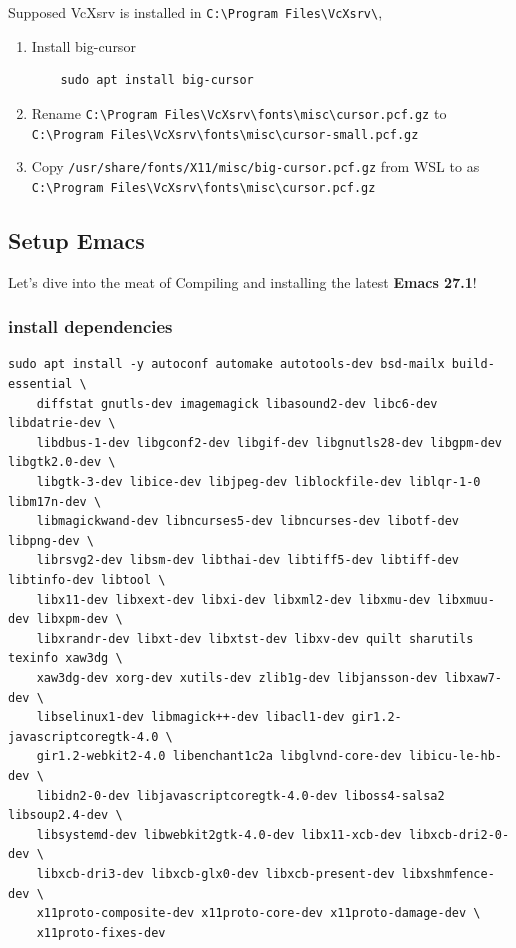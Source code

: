 \documentclass[10pt]{article}
\begin{document}
Supposed VcXsrv is installed in \texttt{C:\textbackslash{}Program Files\textbackslash{}VcXsrv\textbackslash{}},

\begin{enumerate}
\item Install big-cursor
\begin{verbatim}
    sudo apt install big-cursor
\end{verbatim}
\item Rename
\texttt{C:\textbackslash{}Program Files\textbackslash{}VcXsrv\textbackslash{}fonts\textbackslash{}misc\textbackslash{}cursor.pcf.gz} to \texttt{C:\textbackslash{}Program Files\textbackslash{}VcXsrv\textbackslash{}fonts\textbackslash{}misc\textbackslash{}cursor-small.pcf.gz}
\item Copy \texttt{/usr/share/fonts/X11/misc/big-cursor.pcf.gz} from WSL to as \texttt{C:\textbackslash{}Program Files\textbackslash{}VcXsrv\textbackslash{}fonts\textbackslash{}misc\textbackslash{}cursor.pcf.gz}
\end{enumerate}

\subsection{Setup Emacs}
\label{sec:org5d2392f}
Let's dive into the meat of Compiling and installing the latest \textbf{Emacs 27.1}!
\subsubsection{install dependencies}
\label{sec:org0723e69}
\begin{verbatim}
sudo apt install -y autoconf automake autotools-dev bsd-mailx build-essential \
    diffstat gnutls-dev imagemagick libasound2-dev libc6-dev libdatrie-dev \
    libdbus-1-dev libgconf2-dev libgif-dev libgnutls28-dev libgpm-dev libgtk2.0-dev \
    libgtk-3-dev libice-dev libjpeg-dev liblockfile-dev liblqr-1-0 libm17n-dev \
    libmagickwand-dev libncurses5-dev libncurses-dev libotf-dev libpng-dev \
    librsvg2-dev libsm-dev libthai-dev libtiff5-dev libtiff-dev libtinfo-dev libtool \
    libx11-dev libxext-dev libxi-dev libxml2-dev libxmu-dev libxmuu-dev libxpm-dev \
    libxrandr-dev libxt-dev libxtst-dev libxv-dev quilt sharutils texinfo xaw3dg \
    xaw3dg-dev xorg-dev xutils-dev zlib1g-dev libjansson-dev libxaw7-dev \
    libselinux1-dev libmagick++-dev libacl1-dev gir1.2-javascriptcoregtk-4.0 \
    gir1.2-webkit2-4.0 libenchant1c2a libglvnd-core-dev libicu-le-hb-dev \
    libidn2-0-dev libjavascriptcoregtk-4.0-dev liboss4-salsa2 libsoup2.4-dev \
    libsystemd-dev libwebkit2gtk-4.0-dev libx11-xcb-dev libxcb-dri2-0-dev \
    libxcb-dri3-dev libxcb-glx0-dev libxcb-present-dev libxshmfence-dev \
    x11proto-composite-dev x11proto-core-dev x11proto-damage-dev \
    x11proto-fixes-dev
\end{verbatim}
\end{document}
